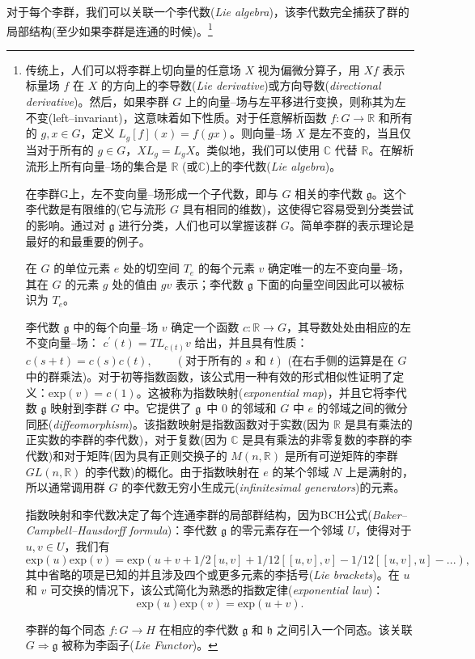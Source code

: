 \documentclass[11pt,fontset=founder]{ctexart}
\begin{document}
对于每个李群，我们可以关联一个李代数(\textit{Lie algebra})，该李代数完全捕获了群的局部结构(至少如果李群是连通的时候)。\footnote{%
传统上，人们可以将李群上切向量的任意场 $X$ 视为偏微分算子，用 $Xf$ 表示标量场 $f$ 在 $X$ 的方向上的李导数(\textit{Lie derivative})或方向导数(\textit{directional derivative})。然后，如果李群 $G$ 上的向量–场与左平移进行变换，则称其为左不变(left--invariant)，这意味着如下性质。对于任意解析函数 $f:G\rightarrow \mathbb{R}$ 和所有的 $g,x\in G$，定义 $L_{g}[f](x)=f(gx)$。则向量–场 $X$ 是左不变的，当且仅当对于所有的 $g\in G$，$XL_{g}=L_{g}X$。类似地，我们可以使用 $\mathbb{C}$ 代替 $\mathbb{R}$。在解析流形上所有向量–场的集合是 $\mathbb{R}$ (或$\mathbb{C}$)上的李代数(\textit{Lie algebra})。
\par
在李群G上，左不变向量–场形成一个子代数，即与 $G$ 相关的李代数 $\mathfrak{g}$。这个李代数是有限维的(它与流形 $G$ 具有相同的维数)，这使得它容易受到分类尝试的影响。通过对 $\mathfrak{g}$ 进行分类，人们也可以掌握该群 $G$。简单李群的表示理论是最好的和最重要的例子。
\par
在 $G$ 的单位元素 $e$ 处的切空间 $T_{e}$ 的每个元素 $v$ 确定唯一的左不变向量–场，其在 $G$ 的元素 $g$ 处的值由 $gv$ 表示；李代数 $\mathfrak{g}$ 下面的向量空间因此可以被标识为 $T_{e}$。
\par
李代数 $\mathfrak{g}$ 中的每个向量–场 $v$ 确定一个函数 $c:\mathbb{R}\rightarrow G$，其导数处处由相应的左不变向量–场： $c^{\prime}(t)=TL_{c(t)}v$ 给出，并且具有性质：$c(s+t)=c(s)c(t),\qquad (\text{对于所有的 $s$ 和 $t$})$ (在右手侧的运算是在 $G$ 中的群乘法)。对于初等指数函数，该公式用一种有效的形式相似性证明了定义：$\mathrm{exp}(v)=c(1)$。这被称为指数映射(\textit{exponential map})，并且它将李代数 $\mathfrak{g}$ 映射到李群 $G$ 中。它提供了 $\mathfrak{g}$\ 中 $0$ 的邻域和 $G$ 中 $e$ 的邻域之间的微分同胚(\textit{diffeomorphism})。该指数映射是指数函数对于实数(因为 $\mathbb{R}$ 是具有乘法的正实数的李群的李代数)，对于复数(因为 $\mathbb{C}$ 是具有乘法的非零复数的李群的李代数)和对于矩阵(因为具有正则交换子的 $M(n,\mathbb{R})$ 是所有可逆矩阵的李群 $GL(n,\mathbb{R})$ 的李代数)的概化。由于指数映射在 $e$ 的某个邻域 $N$ 上是满射的，所以通常调用群 $G$ 的李代数无穷小生成元(\textit{infinitesimal generators})的元素。
\par
指数映射和李代数决定了每个连通李群的局部群结构，因为BCH公式(\textit{Baker--Campbell--Hausdorff formula})：李代数 $\mathfrak{g}$ 的零元素存在一个邻域 $U$，使得对于 $u,v\in U$，我们有
\begin{equation*}
\mathrm{exp}(u)\mathrm{exp}(v)=\mathrm{exp}%
(u+v+1/2[u,v]+1/12[[u,v],v]-1/12[[u,v],u]-...),
\end{equation*}
其中省略的项是已知的并且涉及四个或更多元素的李括号(\textit{Lie bracket}\emph{s})。在 $u$ 和 $v$ 可交换的情况下，该公式简化为熟悉的指数定律(\textit{exponential law})：
\begin{equation*}
\mathrm{exp}(u)\mathrm{exp}(v)=\mathrm{exp}(u+v).
\end{equation*}%
\par
李群的每个同态 $f:G\rightarrow H$ 在相应的李代数 $\mathfrak{g}$ 和 $\mathfrak{h}$ 之间引入一个同态。该关联 $G\Longrightarrow \mathfrak{g}$ 被称为李函子(\textit{Lie Functor})。}
\end{document}
